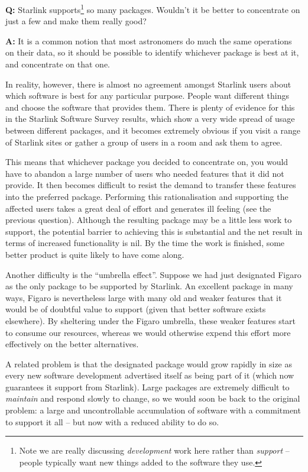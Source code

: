 \documentclass[twoside,11pt]{article}
\newcommand{\htmlref}[2]{#1}
\newcommand{\xref}[3]{#1}
\newcommand{\qt}[1]{``#1''}
\newcommand{\st}[1]{{\em{#1}}}
\newcommand{\qt}[1]{{\tt{"}}#1{\tt{"}}}
\newcommand{\dev}[1]{\htmlref{#1}{development}}
\newcommand{\mnt}[1]{\htmlref{#1}{maintenance}}
\newcommand{\spt}[1]{\htmlref{#1}{support}}
\newcommand{\figaroref}[1]{\xref{#1}{sun86}{}}
\begin{document}
{\Large \bf Q:} Starlink supports\footnote{Note we are really
discussing \st{\dev{development}} work here rather than \st{\spt{support}} --
people typically want new things added to the software they use.} so
many packages.  Wouldn't it be better to concentrate on just a few and
make them really good?

{\Large \bf A:} It is a common notion that most astronomers do much the
same operations on their data, so it should be possible to identify
whichever package is best at it, and concentrate on that one.

In reality, however, there is almost no agreement amongst Starlink
users about which software is best for any particular purpose.  People
want different things and choose the software that provides them.
There is plenty of evidence for this in the Starlink Software Survey
results, which show a very wide spread of usage between different
packages, and it becomes extremely obvious if you visit a range of
Starlink sites or gather a group of users in a room and ask them to
agree.

This means that whichever package you decided to concentrate on, you
would have to abandon a large number of users who needed features that
it did not provide. It then becomes difficult to resist the demand to
transfer these features into the preferred package. Performing this
rationalisation and supporting the affected users takes a great deal
of effort and generates ill feeling (see the \htmlref{previous
question}{illfeeling}). Although the resulting package may be a
little less work to support, the potential barrier to achieving this
is substantial and the net result in terms of increased functionality
is nil. By the time the work is finished, some better product is quite
likely to have come along.

Another difficulty is the \qt{umbrella effect}. Suppose we had just
designated \figaroref{Figaro} as the only package to be supported by
Starlink. An excellent package in many ways, Figaro is nevertheless
large with many old and weaker features that it would be of doubtful
value to support (given that better software exists elsewhere). By
sheltering under the Figaro umbrella, these weaker features start to
consume our resources, whereas we would otherwise expend this effort
more effectively on the better alternatives.

A related problem is that the designated package would grow rapidly in
size as every new software development advertised itself as being part
of it (which now guarantees it support from Starlink).  Large packages
are extremely difficult to \st{\mnt{maintain}} and respond slowly to
change, so we would soon be back to the original problem: a large and
uncontrollable accumulation of software with a commitment to support
it all -- but now with a reduced ability to do so.
\end{document}
